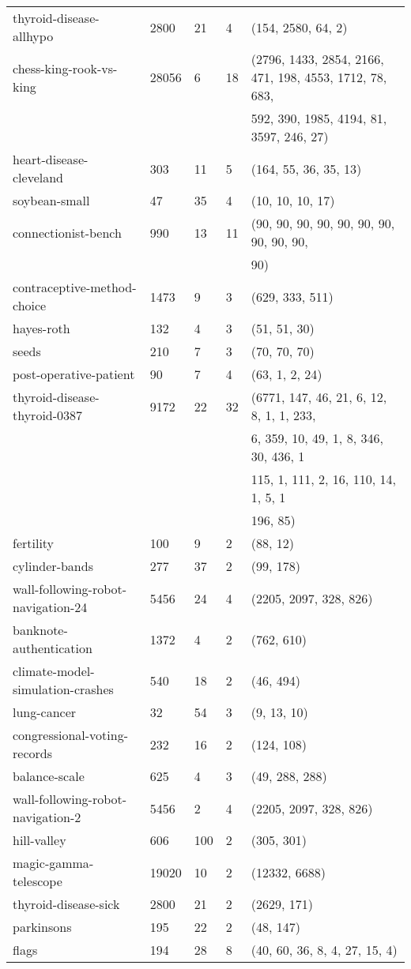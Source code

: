 \documentclass{article}%
\begin{document}
\begin{longtable}{l l l l l}
thyroid{-}disease{-}allhypo&2800&21&4&(154, 2580, 64, 2)\\%
chess{-}king{-}rook{-}vs{-}king&28056&6&18&(2796, 1433, 2854, 2166, 471, 198, 4553, 1712, 78, 683,\\%
&&&&592, 390, 1985, 4194, 81, 3597, 246, 27)\\%
heart{-}disease{-}cleveland&303&11&5&(164, 55, 36, 35, 13)\\%
soybean{-}small&47&35&4&(10, 10, 10, 17)\\%
connectionist{-}bench&990&13&11&(90, 90, 90, 90, 90, 90, 90, 90, 90, 90,\\%
&&&&90)\\%
contraceptive{-}method{-}choice&1473&9&3&(629, 333, 511)\\%
hayes{-}roth&132&4&3&(51, 51, 30)\\%
seeds&210&7&3&(70, 70, 70)\\%
post{-}operative{-}patient&90&7&4&(63, 1, 2, 24)\\%
thyroid{-}disease{-}thyroid{-}0387&9172&22&32&(6771, 147, 46, 21, 6, 12, 8, 1, 1, 233,\\%
&&&&6, 359, 10, 49, 1, 8, 346, 30, 436, 1\\%
&&&&115, 1, 111, 2, 16, 110, 14, 1, 5, 1\\%
&&&&196, 85)\\%
fertility&100&9&2&(88, 12)\\%
cylinder{-}bands&277&37&2&(99, 178)\\%
wall{-}following{-}robot{-}navigation{-}24&5456&24&4&(2205, 2097, 328, 826)\\%
banknote{-}authentication&1372&4&2&(762, 610)\\%
climate{-}model{-}simulation{-}crashes&540&18&2&(46, 494)\\%
lung{-}cancer&32&54&3&(9, 13, 10)\\%
congressional{-}voting{-}records&232&16&2&(124, 108)\\%
balance{-}scale&625&4&3&(49, 288, 288)\\%
wall{-}following{-}robot{-}navigation{-}2&5456&2&4&(2205, 2097, 328, 826)\\%
hill{-}valley&606&100&2&(305, 301)\\%
magic{-}gamma{-}telescope&19020&10&2&(12332, 6688)\\%
thyroid{-}disease{-}sick&2800&21&2&(2629, 171)\\%
parkinsons&195&22&2&(48, 147)\\%
flags&194&28&8&(40, 60, 36, 8, 4, 27, 15, 4)\\%

\end{longtable}
\end{document}
